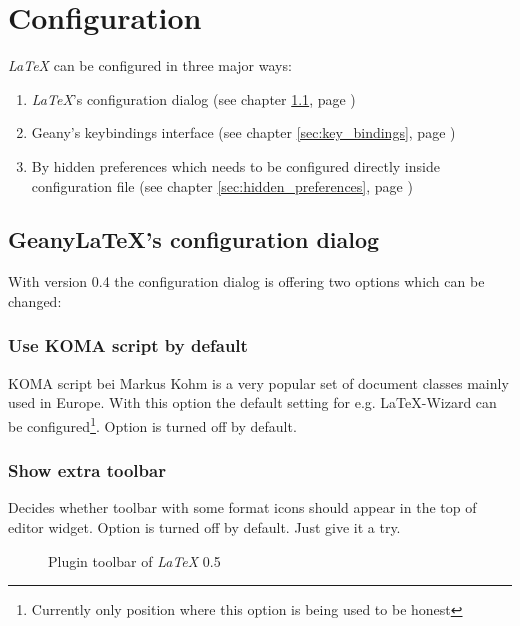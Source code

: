 \documentclass[%
paper=a4,%
fontsize=11pt,%
twoside=false,%
DIV18,%
headsepline,%
plainheadsepline,%
footsepline,%
plainfootsepline,%
bibliography=totoc,%
listof=totoc,%
BCOR10mm,%
parskip=half,%
openany,%
]{scrreprt}
\begin{document}
\chapter{Configuration}

\textit{LaTeX} can be configured in three major ways:
\begin{enumerate}
\item \textit{LaTeX}'s configuration dialog (see chapter \ref{sec:configuration_dialog},
    page \pageref{sec:configuration_dialog})
\item Geany's keybindings interface (see chapter \ref{sec:key_bindings},
    page \pageref{sec:key_bindings})
\item By hidden preferences which needs to be configured directly inside
      configuration file (see chapter \ref{sec:hidden_preferences},
    page \pageref{sec:hidden_preferences})
\end{enumerate}

\section{GeanyLaTeX{}'s configuration dialog}
\label{sec:configuration_dialog}
With version 0.4 the configuration dialog is offering two options which
can be changed:

\subsection{Use KOMA script by default}
KOMA script bei Markus Kohm is a very popular set of document classes
mainly used in Europe. With this option the default setting for e.g.
\LaTeX{}-Wizard can be configured\footnote{Currently only position where
this option is being used to be honest}. Option is turned off by default.

\subsection{Show extra toolbar}
\label{sec:toolbar}
Decides whether toolbar with some format icons should appear in the top
of editor widget. Option is turned off by default. Just give it a try.

\begin{figure}[h!]
    \caption{Plugin toolbar of \textit{LaTeX} 0.5}
\end{figure}
\end{document}
